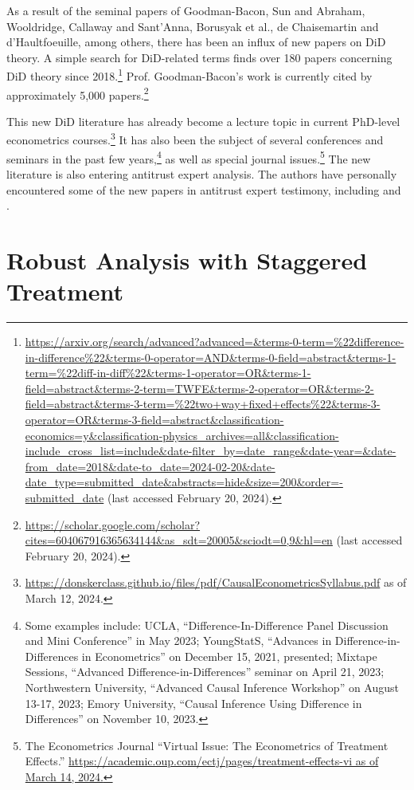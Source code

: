 \documentclass[12pt]{article}
\begin{document}
As a result of the seminal papers of Goodman-Bacon, Sun and Abraham, Wooldridge, Callaway and Sant’Anna, Borusyak et al., de Chaisemartin and d’Haultfoeuille, among others, there has been an influx of new papers on DiD theory. A simple search for DiD-related terms finds over 180 papers concerning DiD theory since 2018.\footnote{\url{https://arxiv.org/search/advanced?advanced=&terms-0-term=\%22difference-in-difference\%22&terms-0-operator=AND&terms-0-field=abstract&terms-1-term=\%22diff-in-diff\%22&terms-1-operator=OR&terms-1-field=abstract&terms-2-term=TWFE&terms-2-operator=OR&terms-2-field=abstract&terms-3-term=\%22two+way+fixed+effects\%22&terms-3-operator=OR&terms-3-field=abstract&classification-economics=y&classification-physics_archives=all&classification-include_cross_list=include&date-filter_by=date_range&date-year=&date-from_date=2018&date-to_date=2024-02-20&date-date_type=submitted_date&abstracts=hide&size=200&order=-submitted_date} (last accessed February 20, 2024).}  Prof. Goodman-Bacon’s work is currently cited by approximately 5,000 papers.\footnote{\url{https://scholar.google.com/scholar?cites=604067916365634144&as_sdt=20005&sciodt=0,9&hl=en} (last accessed February 20, 2024).}

This new DiD literature has already become a lecture topic in current PhD-level econometrics courses.\footnote{\url{https://donskerclass.github.io/files/pdf/CausalEconometricsSyllabus.pdf} as of March 12, 2024.}  It has also been the subject of several conferences and seminars in the past few years,\footnote{Some examples include: UCLA, “Difference-In-Difference Panel Discussion and Mini Conference” in May 2023; YoungStatS, “Advances in Difference-in-Differences in Econometrics” on December 15, 2021, presented; Mixtape Sessions, “Advanced Difference-in-Differences” seminar on April 21, 2023; Northwestern University, “Advanced Causal Inference Workshop” on August 13-17, 2023; Emory University, “Causal Inference Using Difference in Differences” on November 10, 2023.} as well as special journal issues.\footnote{The Econometrics Journal “Virtual Issue: The Econometrics of Treatment Effects.” \url{https://academic.oup.com/ectj/pages/treatment-effects-vi as of March 14, 2024.}} The new literature is also entering antitrust expert analysis. The authors have personally encountered some of the new papers in antitrust expert testimony, including \citet{CS2021} and \citet{goodman-bacon2021a}.

\section{Robust Analysis with Staggered Treatment} \label{sec:equations}
\end{document}
